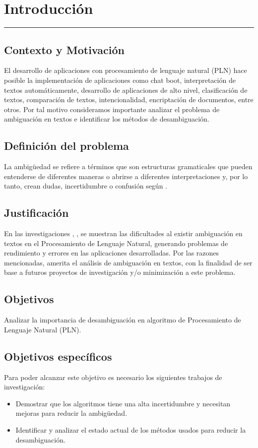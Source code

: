 \chapter{Introducción}
\hrule \bigskip \vspace*{1cm}
\section{Contexto y Motivación}
El desarrollo de aplicaciones con procesamiento de lenguaje natural (PLN) hace posible la implementación de aplicaciones como chat boot, interpretación de textos automáticamente, desarrollo de aplicaciones de alto nivel, clasificación de textos, comparación de textos, intencionalidad, encriptación de documentos, entre otros. Por tal motivo consideramos importante analizar el problema de ambiguación en textos e identificar los métodos de desambiguación. 

\section{Definición del problema}
La ambigüedad se refiere a términos que son estructuras gramaticales que pueden entenderse de diferentes maneras o abrirse a diferentes interpretaciones y, por lo tanto, crean dudas, incertidumbre o confusión según \cite{EvaluacionAmbiguedad01}.

\section{Justificación}
En las investigaciones \cite{ChatBoot}, \cite{055} , \cite{056}se muestran las dificultades al existir ambiguación en textos en el Procesamiento de Lenguaje Natural, generando problemas de rendimiento y errores en las aplicaciones desarrolladas. Por las razones mencionadas, amerita el análisis de ambiguación en textos, con la finalidad de ser base a futuros proyectos de investigación y/o minimización a este problema. 

\section{Objetivos}

 Analizar la importancia de desambiguación en algoritmo de Procesamiento de Lenguaje Natural (PLN).

\section{Objetivos específicos}
Para poder alcanzar este objetivo es necesario los siguientes trabajos de investigación:
\begin{itemize}
  \item Demostrar que los algoritmos tiene una alta incertidumbre y necesitan mejoras para reducir la ambigüedad.
  \item Identificar y analizar el estado actual de los métodos usados para reducir la desambiguación.
\end{itemize}

